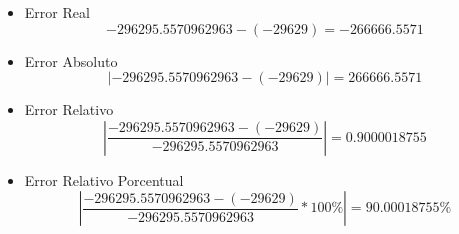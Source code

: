 \documentclass[12pt]{article}
\begin{document}
\begin{itemize}
\item Error Real
$$-296295.5570962963 - (-29629) = -266666.5571$$
\item Error Absoluto
$$
\left| -296295.5570962963 - (-29629) \right| = 266666.5571
$$
\item Error Relativo
$$
\left| \frac{-296295.5570962963 - (-29629)}{-296295.5570962963} \right| = 0.9000018755
$$
\item Error Relativo Porcentual
$$
\left| \frac{-296295.5570962963 - (-29629)}{-296295.5570962963} *100\% \right| = 90.00018755\%
$$ 
\end{itemize}

\vspace{0.5cm}


\renewcommand{\refname}{\MakeUppercase{REFERENCIAS}}
%
%
\end{document}
